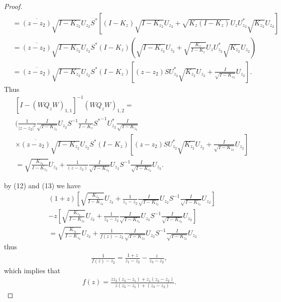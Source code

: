 \documentclass{amsart}
\begin{document}
\begin{proof}
\begin{align*}
                &= \overline{(z-z_2)}\sqrt{I-K_{z_2}}U_{z_2}S^{*}[(I-K_z)\sqrt{I - K_{z_2}}U_{z_2} + \sqrt{K_{z}(I-K_z)}U_{z}U_{z_2}^{*}\sqrt{K_{z_2}}U_{z_2}]\\
                &= \overline{(z-z_2)}\sqrt{I-K_{z_2}}U_{z_2}S^{*}(I-K_z)(\sqrt{I-K_{z_2}}U_{z_2} + \sqrt{\frac{K_z}{I - K_z}}U_{z}U_{z_2}^{*}\sqrt{K_{z_2}}U_{z_2})\\
                &= \overline{(z-z_2)}\sqrt{I-K_{z_2}}U_{z_2}S^{*}(I-K_z)[(z -z_2)SU^{*}_{z_2}\sqrt{K_{z_2}}U_{z_2} + \frac{I}{\sqrt{I-K_{z_2}}}U_{z_2}].
\end{align*}
Thus
\begin{equation}\label{(*)}
\begin{split}
&[I - (WQ_{z}W)_{1,1}]^{-1}(WQ_{z}W)_{1,2} = \\
& (\frac{1}{|z-z_2|^{2}}\frac{I}{\sqrt{I-K_{z_2}}}U_{z_2}S^{-1}\frac{I}{I-K_z}{S^{*}}^{-1}U^{*}_{z_2}\frac{I}{\sqrt{I-K_{z_2}}}\\
                                          & \times \overline{(z-z_2)}\sqrt{I-K_{z_2}}U_{z_2}S^{*}(I-K_z)[(z -z_2)SU^{*}_{z_2}\sqrt{K_{z_2}}U_{z_2} + \frac{I}{\sqrt{I-K_{z_2}}}U_{z_2}] \\
                                          &= \sqrt{\frac{K_{z_2}}{I-K_{z_2}}}U_{z_2} + \frac{1}{(z -z_2)}\frac{I}{\sqrt{I-K_{z_2}}}U_{z_2}S^{-1}\frac{I}{\sqrt{I-K_{z_2}}}U_{z_2}.
\end{split}
\end{equation}

by (12) and (13) we have
\begin{align*}
&(1+z)[\sqrt{\frac{K_{z_2}}{I - K_{z_2}}}U_{z_2} + \frac{1}{z_1 - z_2}\frac{I}{\sqrt{I - K_{z_2}}}U_{z_2}S^{-1}\frac{I}{\sqrt{I - K_{z_2}}}U_{z_2}]\\
&-z[\sqrt{\frac{K_{z_2}}{I - K_{z_2}}}U_{z_2} + \frac{1}{z_3 - z_2}\frac{I}{\sqrt{I - K_{z_2}}}U_{z_2}S^{-1}\frac{I}{\sqrt{I - K_{z_2}}}U_{z_2}]\\
& = \sqrt{\frac{K_{z_2}}{I - K_{z_2}}}U_{z_2} + \frac{1}{f(z) - z_2}\frac{I}{\sqrt{I - K_{z_2}}}U_{z_2}S^{-1}\frac{I}{\sqrt{I - K_{z_2}}}U_{z_2}
\end{align*}
thus
\begin{align*}
\frac{1}{f(z) - z_2} = \frac{1+z}{z_1 - z_2} - \frac{z}{z_3 - z_2},
\end{align*}
which implies that
\begin{align*}
f(z) = \frac{zz_2 (z_3 - z_1) + z_1(z_3 - z_2)}{z(z_3 - z_1) + (z_3 - z_2)}.
\end{align*}
\end{proof}
\end{document}
